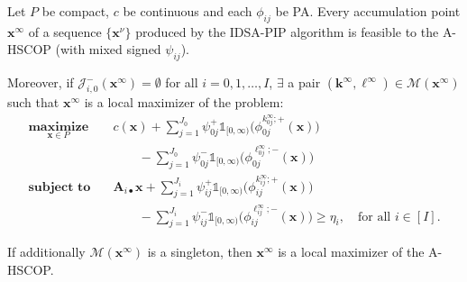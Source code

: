 \documentclass[aspectratio=169,xcolor=dvipsnames]{beamer}
\begin{document}
\begin{frame}
  \footnotesize
  \setlength{\abovedisplayskip}{4pt}
  \setlength{\belowdisplayskip}{4pt}

  Let $P$ be compact, $c$ be continuous and each $\phi_{ij}$ be PA.
  \textcolor{MediumRed}{Every accumulation point} $\mathbf{x}^\infty$ of a
  sequence $\{\mathbf{x}^\nu\}$ produced by the IDSA-PIP algorithm is feasible
  to the \textcolor{MediumRed}{A-HSCOP} (with \textcolor{MediumRed}{mixed
  signed} $\psi_{ij}$).

  \vspace{0.06cm}
  Moreover, if $\mathcal{J}_{i,0}^-(\mathbf{x}^\infty)=\emptyset$ for all
  $i=0,1,\ldots,I$, $\exists$ a pair
  $(\mathbf{k}^\infty,\boldsymbol{\ell}^\infty)\in\mathcal{M}(\mathbf{x}^\infty)$
  such that $\mathbf{x}^\infty$ is a local maximizer of the problem:
  \[
    \begin{aligned}
      \operatorname*{\textbf{maximize}}_{\mathbf{x}\in P}\quad
      &c(\mathbf{x})
        +\sum_{j=1}^{J_0}\psi^+_{0j}\mathds{1}_{[0,\infty)}
          \bigl(\phi^{k^{\infty}_{0j};+}_{0j}(\mathbf{x})\bigr)\\
      &\qquad{}-\sum_{j=1}^{J_0}\psi^-_{0j}\mathds{1}_{[0,\infty)}
          \bigl(\phi^{\ell^{\infty}_{0j};-}_{0j}(\mathbf{x})\bigr)\\[4pt]
      \operatorname*{\textbf{subject to}}\quad
      &\mathbf{A}_{i\bullet}\mathbf{x}
        +\sum_{j=1}^{J_i}\psi^+_{ij}\mathds{1}_{[0,\infty)}
          \bigl(\phi^{k^{\infty}_{ij};+}_{ij}(\mathbf{x})\bigr)\\
      &\qquad{}-\sum_{j=1}^{J_i}\psi^-_{ij}\mathds{1}_{[0,\infty)}
          \bigl(\phi^{\ell^{\infty}_{ij};-}_{ij}(\mathbf{x})\bigr)
        \geq\eta_i,\quad\text{for all }i\in[I].
    \end{aligned}\tag{6}
  \]

  \vspace{0.04cm}
  If additionally $\mathcal{M}(\mathbf{x}^\infty)$ is a singleton, then
  $\mathbf{x}^\infty$ is a local maximizer of the A-HSCOP.
\end{frame}
\end{document}

